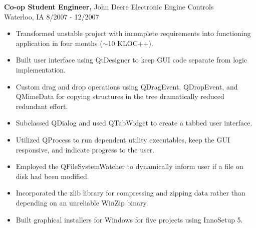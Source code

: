 \documentclass[margin]{res}
\begin{document}
\begin{resume}
\begin{itemize}
\end{itemize}

{\bf Co-op Student Engineer,} John Deere Electronic Engine Controls\\ Waterloo, IA \hfill 8/2007 - 12/2007
\begin{itemize} \itemsep -2pt  %
\item Transformed unstable project with incomplete requirements into functioning application in four months ($\sim$10 KLOC++).
\item Built user interface using QtDesigner to keep GUI code separate from logic implementation.
\item Custom drag and drop operations using QDragEvent, QDropEvent, and QMimeData for copying structures in the tree dramatically reduced redundant effort.
\item Subclassed QDialog and used QTabWidget to create a tabbed user interface.
\item Utilized QProcess to run dependent utility executables, keep the GUI responsive, and indicate progress to the user.
\item Employed the QFileSystemWatcher to dynamically inform user if a file on disk had been modified.
\item Incorporated the zlib library for compressing and zipping data rather than depending on an unreliable WinZip binary.
\item Built graphical installers for Windows for five projects using InnoSetup 5.
\end{itemize}
 

\end{resume}
\end{document}
